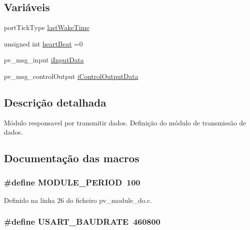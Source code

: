 \subsection*{Variáveis}
\begin{DoxyCompactItemize}
\item 
port\-Tick\-Type \hyperlink{group__app__do_gaa8db3871cb5f64abbd94ddd5a1db73a6}{last\-Wake\-Time}
\item 
unsigned int \hyperlink{group__app__do_ga24475be702ffcc5a6f0a5557040368ef}{heart\-Beat} =0
\item 
pv\-\_\-msg\-\_\-input \hyperlink{group__app__do_gac40b8cfe5fd2000670ad57fe3e75ec89}{i\-Input\-Data}
\item 
pv\-\_\-msg\-\_\-control\-Output \hyperlink{group__app__do_gacabca53fbaffdbf13b8e5a1c29b73bc4}{i\-Control\-Output\-Data}
\end{DoxyCompactItemize}


\subsection{Descrição detalhada}
Módulo responsavel por transmitir dados. Definição do módulo de transmissão de dados. 

\subsection{Documentação das macros}
\hypertarget{group__app__do_ga0ac6c9f2991b096e49c354e5cce6fae0}{
\subsubsection[{M\-O\-D\-U\-L\-E\-\_\-\-P\-E\-R\-I\-O\-D}]{\setlength{\rightskip}{0pt plus 5cm}\#define M\-O\-D\-U\-L\-E\-\_\-\-P\-E\-R\-I\-O\-D~100}}\label{group__app__do_ga0ac6c9f2991b096e49c354e5cce6fae0}


Definido na linha 26 do ficheiro pv\-\_\-module\-\_\-do.\-c.

\hypertarget{group__app__do_ga6a53a6c94a70cc286e300a0ea8f46ba4}{
\subsubsection[{U\-S\-A\-R\-T\-\_\-\-B\-A\-U\-D\-R\-A\-T\-E}]{\setlength{\rightskip}{0pt plus 5cm}\#define U\-S\-A\-R\-T\-\_\-\-B\-A\-U\-D\-R\-A\-T\-E~460800}}\label{group__app__do_ga6a53a6c94a70cc286e300a0ea8f46ba4}



